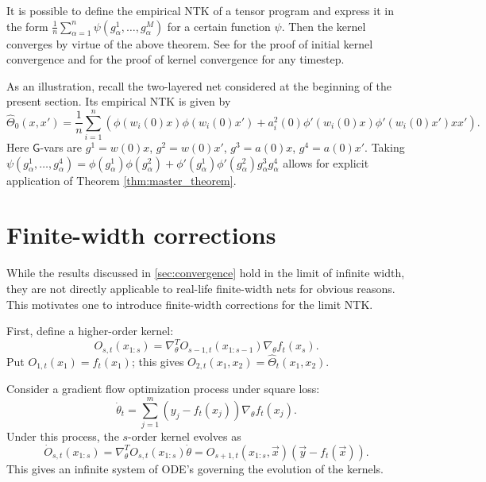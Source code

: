 \documentclass{article}
\newcommand{\Gtype}{\mathsf{G}}
\begin{document}
    It is possible to define the empirical NTK of a tensor program and express it in the form $\frac{1}{n} \sum_{\alpha=1}^n \psi(g^1_\alpha,\ldots,g^M_\alpha)$ for a certain function $\psi$.
    Then the kernel converges by virtue of the above theorem.
    See \cite{yang2020tensor_ii} for the proof of initial kernel convergence and \cite{yang2021tensor_iib} for the proof of kernel convergence for any timestep.

    As an illustration, recall the two-layered net considered at the beginning of the present section.
    Its empirical NTK is given by
    \begin{equation}
        \hat\Theta_0(x,x')
        = \frac{1}{n} \sum_{i=1}^n \left(\phi(w_i(0) x) \phi(w_i(0) x') + a_i^2(0) \phi'(w_i(0) x) \phi'(w_i(0) x') x x'\right).
    \end{equation}
    Here $\Gtype$-vars are $g^1 = w(0) x$, $g^2 = w(0) x'$, $g^3 = a(0) x$, $g^4 = a(0) x'$.
    Taking $\psi(g^1_\alpha,\ldots,g^4_\alpha) = \phi(g^1_\alpha) \phi(g^2_\alpha) + \phi'(g^1_\alpha) \phi'(g^2_\alpha) g^3_\alpha g^4_\alpha$ allows for explicit application of Theorem \ref{thm:master_theorem}.


    \section{Finite-width corrections}
    \label{sec:finite_width}

    While the results discussed in \cref{sec:convergence} hold in the limit of infinite width, they are not directly applicable to real-life finite-width nets for obvious reasons.
    This motivates one to introduce finite-width corrections for the limit NTK.

    First, define a higher-order kernel:
    \begin{equation}
        O_{s,t}(x_{1:s})
        = \nabla^T_\theta O_{s-1,t}(x_{1:s-1}) \nabla_\theta f_t(x_s).
    \end{equation}
    Put $O_{1,t}(x_1) = f_t(x_1)$; this gives $O_{2,t}(x_1,x_2) = \hat\Theta_t(x_1,x_2)$.

    Consider a gradient flow optimization process under square loss:
    \begin{equation}
        \dot\theta_t
        = \sum_{j=1}^m (y_j - f_t(x_j)) \nabla_\theta f_t(x_j).
    \end{equation}
    Under this process, the $s$-order kernel evolves as
    \begin{equation}
        \dot O_{s,t}(x_{1:s})
        = \nabla^T_\theta O_{s,t}(x_{1:s}) \dot\theta
        = O_{s+1,t}(x_{1:s},\vec x) (\vec y - f_t(\vec x)).
    \end{equation}
    This gives an infinite system of ODE's governing the evolution of the kernels.
\end{document}
